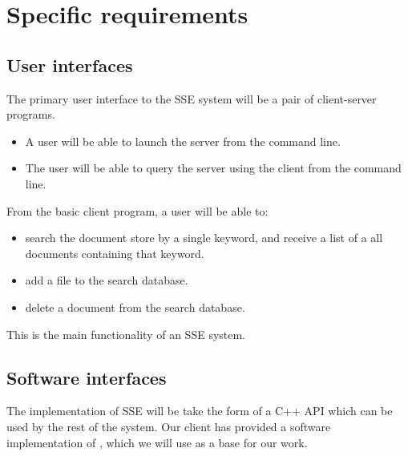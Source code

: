 \documentclass[onecolumn, draftclsnofoot,10pt, compsoc]{IEEEtran}
\begin{document}
\section{ Specific requirements } %


\subsection{ User interfaces }

The primary user interface to the SSE system will be a pair of client-server programs.
\begin{itemize}
\item A user will be able to launch the server from the command line.
\item The user will be able to query the server using the client from the command line. 
\end{itemize}

From the basic client program, a user will be able to:

\begin{itemize}
\item search the document store by a single keyword, and receive a list of a all documents containing that keyword. 
\item add a file to the search database.
\item delete a document from the search database.
\end{itemize}

This is the main functionality of an SSE system.


\subsection{ Software interfaces }

The implementation of SSE will be take the form of a C++ API which can be used by the rest of the system. 
Our client has provided a software implementation of \cite{yavuz15}, which we will use as a base for our work.
\end{document}
